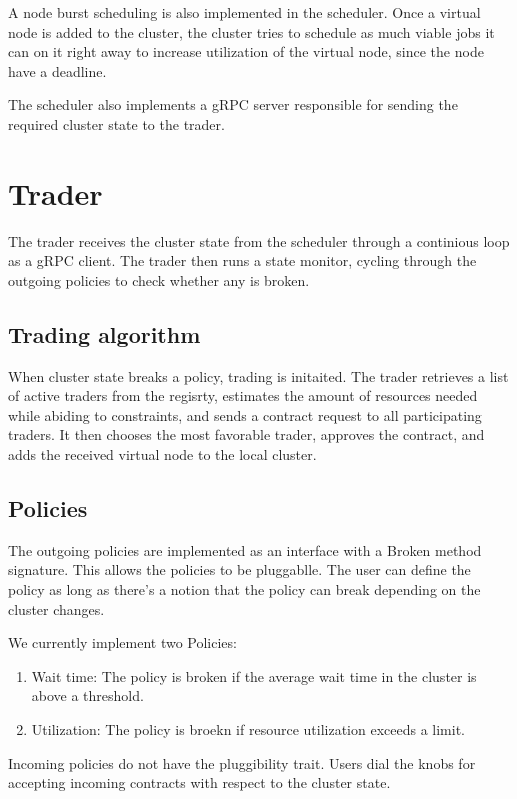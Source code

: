 A node burst scheduling is also implemented in the scheduler. Once a virtual
node is added to the cluster, the cluster tries to schedule as much viable jobs
it can on it right away to increase utilization of the virtual node, since the
node have a deadline. 

The scheduler also implements a gRPC server responsible for sending the
required cluster state to the trader.

\section{Trader}

The trader receives the cluster state from the scheduler through a continious
loop as a gRPC client. The trader then runs a state monitor, cycling through
the outgoing policies to check whether any is broken.   

\subsection{Trading algorithm}

When cluster state breaks a policy, trading is initaited. The trader retrieves
a list of active traders from the regisrty, estimates the amount of resources
needed while abiding to constraints, and sends a contract request to all
participating traders. It then chooses the most favorable trader, approves the
contract, and adds the received virtual node to the local cluster. 

\subsection{Policies}



The outgoing policies are implemented as an interface with a Broken method
signature. This allows the policies to be pluggablle. The user can define the
policy as long as there's a notion that the policy can break depending on the
cluster changes.

We currently implement two Policies:
\begin{enumerate}
  \item Wait time: The policy is broken if the average wait time in the cluster
    is above a threshold.
  \item Utilization: The policy is broekn if resource utilization exceeds a
    limit. 
\end{enumerate}

Incoming policies do not have the pluggibility trait. Users dial the knobs for
accepting incoming contracts with respect to the cluster state.
